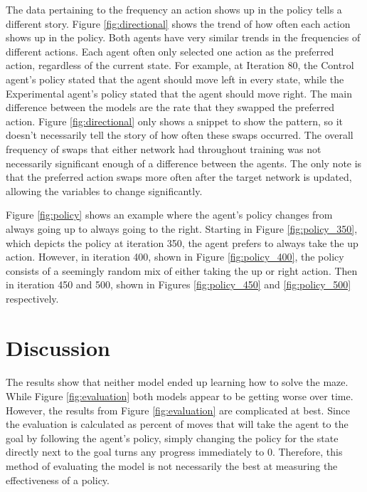 \documentclass[12pt]{article}
\begin{document}
The data pertaining to the frequency an action shows up in the policy tells a different story.
Figure \ref{fig:directional} shows the trend of how often each action shows up in the policy.
Both agents have very similar trends in the frequencies of different actions.
Each agent often only selected one action as the preferred action, regardless of the current state.
For example, at Iteration 80, the Control agent's policy stated that the agent should move left in every state, while the Experimental agent's policy stated that the agent should move right.
The main difference between the models are the rate that they swapped the preferred action.
Figure \ref{fig:directional} only shows a snippet to show the pattern, so it doesn't necessarily tell the story of how often these swaps occurred.
The overall frequency of swaps that either network had throughout training was not necessarily significant enough of a difference between the agents.
The only note is that the preferred action swaps more often after the target network is updated, allowing the variables to change significantly.

Figure \ref{fig:policy} shows an example where the agent's policy changes from always going up to always going to the right.
Starting in Figure \ref{fig:policy_350}, which depicts the policy at iteration 350, the agent prefers to always take the up action.
However, in iteration 400, shown in Figure \ref{fig:policy_400}, the policy consists of a seemingly random mix of either taking the up or right action.
Then in iteration 450 and 500, shown in Figures \ref{fig:policy_450} and \ref{fig:policy_500} respectively.






\section{Discussion}

% 


\paragraph{}
The results show that neither model ended up learning how to solve the maze. 
While Figure \ref{fig:evaluation} both models appear to be getting worse over time.
However, the results from Figure \ref{fig:evaluation} are complicated at best.
Since the evaluation is calculated as percent of moves that will take the agent to the goal by following the agent's policy, simply changing the policy for the state directly next to the goal turns any progress immediately to 0.
Therefore, this method of evaluating the model is not necessarily the best at measuring the effectiveness of a policy.
\end{document}
